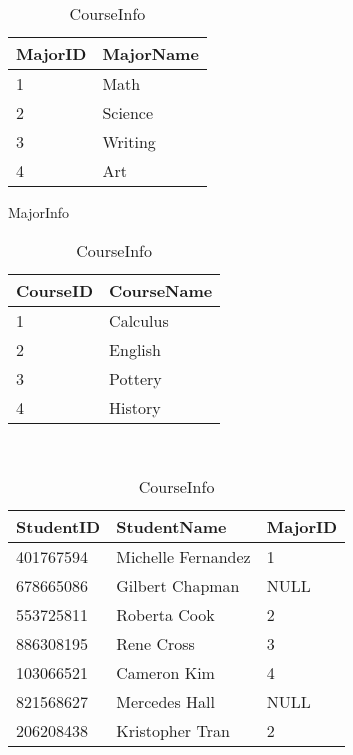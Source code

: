 \begin{table}[H]
\begin{subtable}{0.55\textwidth}
    \centering
    \begin{subtable}{.45\textwidth}
        \centering
        \footnotesize
        \begin{tabular}{|l|l|}
            \hline MajorID & MajorName \\ \hline
            1 & Math \\
            2 & Science \\
            3 & Writing \\
            4 & Art \\ \hline
        \end{tabular}
        \caption{MajorInfo}
        \label{table:sql1-student-majorinfo}
    \end{subtable}
    \hfil
    \begin{subtable}{.45\textwidth}
        \centering
        \footnotesize
        \begin{tabular}{|l|l|}
            \hline CourseID & CourseName \\ \hline
            1 & Calculus \\
            2 & English \\
            3 & Pottery \\
            4 & History \\ \hline
        \end{tabular}
        \caption{CourseInfo}
        \label{table:sql1-student-courseinfo}
    \end{subtable}
    \\[1.em] %
    \begin{subtable}{\textwidth}
        \centering
        \footnotesize
        \begin{tabular}{|l|l|l|}
            \hline StudentID & StudentName & MajorID \\ \hline
            401767594 & Michelle Fernandez & 1 \\
            678665086 & Gilbert Chapman & NULL \\
            553725811 & Roberta Cook & 2 \\
            886308195 & Rene Cross & 3 \\
            103066521 & Cameron Kim & 4 \\
            821568627 & Mercedes Hall & NULL \\
            206208438 & Kristopher Tran & 2 \\

\end{tabular}
\end{subtable}
\end{subtable}
\end{table}
